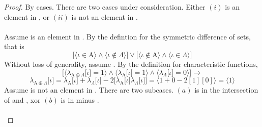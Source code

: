 \documentclass[preview]{standalone}
\begin{document}
\begin{proof}
    By cases. There are two cases under consideration. 
    Either $(i)$ \bm{$\iota$} is an element in , 
    or $(ii)$ \bm{$\iota$} is not an element in .
    \\ \\
     Assume \bm{$\iota$} is an element in . 
    By the defintion for the symmetric difference of sets, that is
    \begin{equation*}
        \bigg[
            \Big \langle \iota \in \mathrm{A} \Big \rangle 
                \land 
            \Big \langle \iota \notin \Lambda \Big \rangle
        \bigg] 
            \lor 
        \bigg[
            \Big \langle \iota \notin \mathrm{A} \Big \rangle 
                \land 
            \Big \langle \iota \in \Lambda \Big \rangle
        \bigg]    
    \end{equation*}
    Without loss of generality, assume 
    .
    By the definition for characteristic functions,
    \begin{equation*}
        \bigg[
            \Big \langle \lambda_{\mathrm{A} \oplus \Lambda} \big[ \iota \big] = 1 \Big \rangle
                \land 
            \Big \langle \lambda_{\mathrm{A}} \big[ \iota \big] = 1 \Big \rangle
                \land 
            \Big \langle \lambda_{\Lambda} \big[ \iota \big] = 0 \Big \rangle
        \bigg]
            \rightarrow
    \end{equation*}
    \begin{equation*}
        \lambda_{\mathrm{A} \oplus \Lambda} \big[ \iota \big]
            =
        \lambda_{\mathrm{A}} \big[ \iota \big] 
            + 
        \lambda_{\Lambda} \big[ \iota \big] 
            - 
        2 \Big[ \lambda_{\mathrm{A}} \big[ \iota \big] \lambda_{\Lambda} \big[ \iota \big] \Big]
            =
        \Big \langle 1 + 0 - 2 [ 1 ] [ 0 ] \Big \rangle
            =
        \Big \langle
            1
        \Big \rangle 
    \end{equation*}
     Assume \bm{$\iota$} is not an element in . 
    There are two subcases. 
    $(a)$ \bm{$\iota$} is in the intersection of  and \bm{$\Lambda$}, 
    xor $(b)$ \bm{$\iota$} is in \bm{$\Omega$} minus .
    \\ \\

\end{proof}
\end{document}
